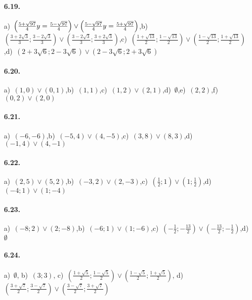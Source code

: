 \paragraph{6.19.} a)~\(\left(\frac{5+\sqrt{97}} 4\\y=\frac{5-\sqrt{97}} 4\right)\vee \left(\frac{5-\sqrt{97}} 4\\y=\frac{5+\sqrt{97}} 4\right)\),\quad b)~\(\left(\frac{3+{2\sqrt 3}} 3;\frac {3-{2\sqrt 3}} 3\right)\vee \left(\frac {3-{2\sqrt 3}} 3;\frac{3+{2\sqrt 3}} 3\right)\),\quad c)~\(\left(\frac{1+\sqrt{13}} 2;\frac{1-\sqrt{13}} 2\right)\vee \left(\frac{1-\sqrt{13}} 2;\frac{1+\sqrt{13}} 2\right)\),\quad d)~\(\left(2+3\sqrt 6;2-3\sqrt 6\right)\vee \left(2-3\sqrt 6;2+3\sqrt 6\right)\)

\paragraph{6.20.} a)~\((1,0)\vee(0,1)\),\quad b)~\((1,1)\),\quad c)~\((1,2)\vee(2,1)\),\quad d)~\(\emptyset\),\quad e)~\((2,2)\),\quad f)~\((0,2)\vee(2,0)\)

\paragraph{6.21.} a)~\((-6,-6)\),\quad b)~\((-5,4)\vee(4,-5)\),\quad c)~\((3,8)\vee(8,3)\),\quad d)~\((-1,4)\vee(4,-1)\)

\paragraph{6.22.} a)~\((2,5)\vee(5,2)\),\quad b)~\((-3,2)\vee(2,-3)\),\quad c)~\((\frac 1 2;1)\vee(1;\frac 1 2)\),\quad d)~\((-4;1)\vee(1;-4)\)

\paragraph{6.23.} a)~\((-8;2)\vee(2;-8)\),\quad b)~\((-6;1)\vee(1;-6)\),\quad c)~\(\left(-\frac 1 2;-\frac{13} 2\right)\vee \left(-\frac{13} 2;-\frac 1 2\right)\),\quad d)~\(\emptyset \)

\paragraph{6.24.} a)~\(\emptyset \),\; b)~\((3;3)\),\; c)~\(\left(\frac{1+\sqrt 5} 2;\frac{1-\sqrt 5} 2\right)\vee \left(\frac{1-\sqrt 5} 2;\frac{1+\sqrt 5} 2\right)\),\; d)~\(\left(\frac{3+\sqrt 7} 2;\frac{3-\sqrt 7} 2\right)\vee \left(\frac{3-\sqrt 7} 2;\frac{3+\sqrt 7} 2\right)\)

